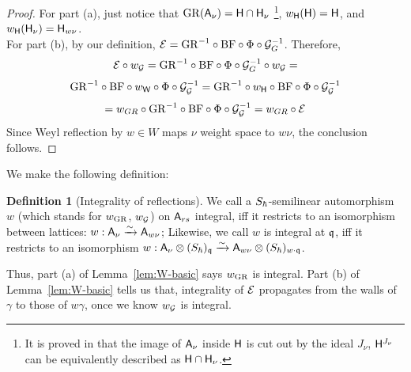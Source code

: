 \documentclass{article}
\theoremstyle{plain}
\theoremstyle{definition}
\newtheorem{definition}[theorem]{Definition}
\theoremstyle{remark}
\numberwithin{equation}{section}
\begin{document}
\begin{proof}
For part (a), just notice that $\mathrm{GR}(\mathsf A_\nu)=\mathsf H\cap\mathsf H_\nu$ \cite[Theorem 1.4.1]{ginzburg2022differentialoperatorsgugelfandgraev} \footnote{It is proved in \cite{ginzburg2022differentialoperatorsgugelfandgraev} that the image of $\mathsf A_\nu$ inside $\mathsf H$ is cut out by the ideal $J_\nu$, $\mathsf H^{J_\nu}$ can be equivalently described as $\mathsf H \cap \mathsf H_\nu$. }, $w_{\mathsf H}(\mathsf H)=\mathsf H$, and $w_{\mathsf H}(\mathsf H_\nu)=\mathsf H_{w\nu}$. \\
For part (b), by our definition, $\mathcal E=\mathrm{GR}^{-1} \circ \mathrm{BF}\circ\Phi\circ\mathcal G_G^{-1}$. Therefore, 
\begin{equation*}
    \mathcal E \circ w_{\mathcal G} = \mathrm{GR}^{-1}\circ \mathrm{BF} \circ \Phi \circ \mathcal G_{G}^{-1} \circ w_{\mathcal G} = 
\end{equation*}
\begin{equation*}
    \mathrm{GR}^{-1}\circ \mathrm{BF} \circ w_{\mathsf W} \circ \Phi \circ \mathcal G_{\mathcal G}^{-1} =   \mathrm{GR}^{-1} \circ w_{\mathsf H} \circ \mathrm{BF} \circ \Phi \circ \mathcal G_{\mathcal G}^{-1}
\end{equation*}
\begin{equation*}
    = w_{GR} \circ \mathrm{GR}^{-1}\circ \mathrm{BF} \circ \Phi \circ \mathcal G_{\mathcal G}^{-1} = w_{GR}\circ \mathcal E
\end{equation*}
Since Weyl reflection by $w \in W$ maps $\nu$ weight space to $w\nu$, the conclusion follows.
\end{proof}
We make the following definition:
\begin{definition}[Integrality of reflections]\label{def:w-int}
    We call a $S_\hbar$-semilinear automorphism $w$ (which stands for $w_{\mathrm{GR}}$, $w_\mathcal G$) on $\mathsf A_{rs}$ integral, iff it restricts to an isomorphism between lattices: $w: \mathsf A_\nu \xrightarrow{\sim} \mathsf A_{w\nu}$; Likewise, we call $w$ is integral at $\mathfrak q$, iff it restricts to an isomorphism $w: \mathsf A_\nu \otimes (S_\hbar)_\mathfrak q \xrightarrow{\sim} \mathsf A_{w\nu} \otimes (S_\hbar)_{w\cdot\mathfrak q}$.
\end{definition}

Thus, part (a) of Lemma~\ref{lem:W-basic} says $w_{\mathrm{GR}}$ is integral. Part (b) of Lemma~\ref{lem:W-basic} tells us that, integrality of $\mathcal E$ propagates from the walls of $\gamma$ to those of $w\gamma$, once we know $w_{\mathcal G}$ is integral.
\end{document}
